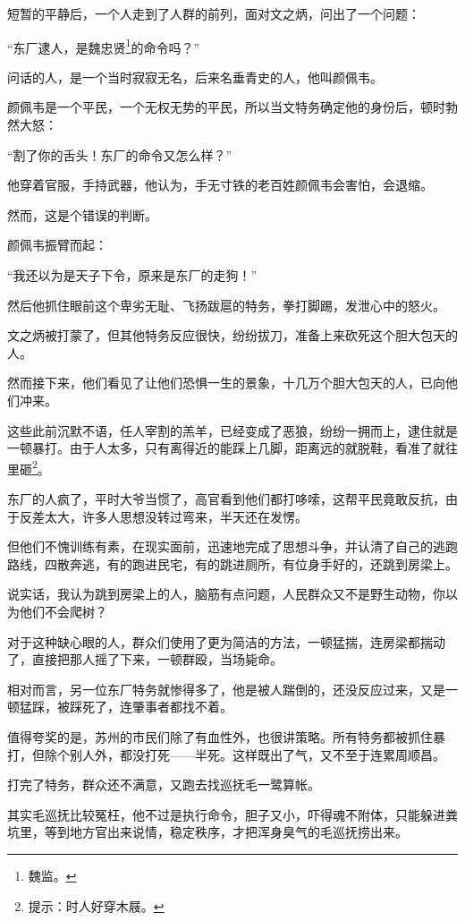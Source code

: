 \begin{multicols}{\theparacolNo}
		短暂的平静后，一个人走到了人群的前列，面对文之炳，问出了一个问题：

		“东厂逮人，是魏忠贤\footnote{魏监。}的命令吗？”

		问话的人，是一个当时寂寂无名，后来名垂青史的人，他叫颜佩韦。

		颜佩韦是一个平民，一个无权无势的平民，所以当文特务确定他的身份后，顿时勃然大怒：

		“割了你的舌头！东厂的命令又怎么样？”

		他穿着官服，手持武器，他认为，手无寸铁的老百姓颜佩韦会害怕，会退缩。

		然而，这是个错误的判断。

		颜佩韦振臂而起：

		“我还以为是天子下令，原来是东厂的走狗！”

		然后他抓住眼前这个卑劣无耻、飞扬跋扈的特务，拳打脚踢，发泄心中的怒火。

		文之炳被打蒙了，但其他特务反应很快，纷纷拔刀，准备上来砍死这个胆大包天的人。

		然而接下来，他们看见了让他们恐惧一生的景象，十几万个胆大包天的人，已向他们冲来。

		这些此前沉默不语，任人宰割的羔羊，已经变成了恶狼，纷纷一拥而上，逮住就是一顿暴打。由于人太多，只有离得近的能踩上几脚，距离远的就脱鞋，看准了就往里砸\footnote{提示：时人好穿木屐。}。

		东厂的人疯了，平时大爷当惯了，高官看到他们都打哆嗦，这帮平民竟敢反抗，由于反差太大，许多人思想没转过弯来，半天还在发愣。

		但他们不愧训练有素，在现实面前，迅速地完成了思想斗争，并认清了自己的逃跑路线，四散奔逃，有的跑进民宅，有的跳进厕所，有位身手好的，还跳到房梁上。

		说实话，我认为跳到房梁上的人，脑筋有点问题，人民群众又不是野生动物，你以为他们不会爬树？

		对于这种缺心眼的人，群众们使用了更为简洁的方法，一顿猛揣，连房梁都揣动了，直接把那人摇了下来，一顿群殴，当场毙命。

		相对而言，另一位东厂特务就惨得多了，他是被人踹倒的，还没反应过来，又是一顿猛踩，被踩死了，连肇事者都找不着。

		值得夸奖的是，苏州的市民们除了有血性外，也很讲策略。所有特务都被抓住暴打，但除个别人外，都没打死——半死。这样既出了气，又不至于连累周顺昌。

		打完了特务，群众还不满意，又跑去找巡抚毛一鹭算帐。

		其实毛巡抚比较冤枉，他不过是执行命令，胆子又小，吓得魂不附体，只能躲进粪坑里，等到地方官出来说情，稳定秩序，才把浑身臭气的毛巡抚捞出来。


\end{multicols}
